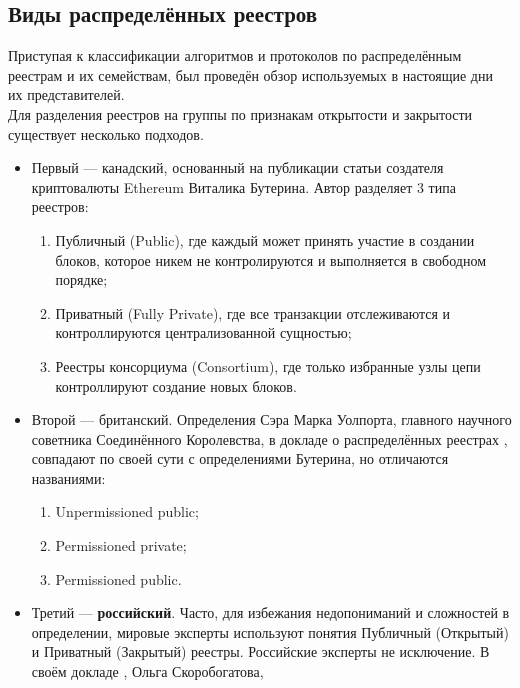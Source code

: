 \subsection{Виды распределённых реестров}\label{kinds_reestrs}
Приступая к классификации алгоритмов и протоколов по распределённым реестрам и
их семействам, был проведён обзор используемых в настоящие дни их
представителей.\\
Для разделения реестров на группы по признакам открытости и закрытости
существует несколько подходов.
\begin{itemize}
    \item Первый --- канадский, основанный на публикации статьи
        \cite{VitalikButerin2015} создателя криптовалюты Ethereum Виталика
        Бутерина. Автор разделяет 3 типа реестров:
          \begin{enumerate}
              \item Публичный (Public), где каждый может принять участие в
                  создании блоков, которое никем не контролируются и
                  выполняется в свободном порядке;
              \item Приватный (Fully Private), где все транзакции отслеживаются
                  и контроллируются централизованной сущностью;
              \item Реестры консорциума (Consortium), где только избранные узлы
                  цепи контроллируют создание новых блоков.
          \end{enumerate}
     \item Второй --- британский. Определения Сэра Марка Уолпорта, главного
         научного советника Соединённого Королевства, в докладе о
         распределённых реестрах \cite{DeLeon2018}, совпадают по своей сути с определениями
         Бутерина, но отличаются названиями:
         \begin{enumerate}
                 \item Unpermissioned public;
                 \item Permissioned private;
                 \item Permissioned public.
         \end{enumerate}
     \item Третий --- \textbf{российский}. Часто, для избежания недопониманий и
         сложностей в определении, мировые эксперты используют понятия
         Публичный (Открытый) и Приватный (Закрытый) реестры. Российские
         эксперты не исключение. В своём докладе \cite{2016}, Ольга Скоробогатова,

\end{itemize}
